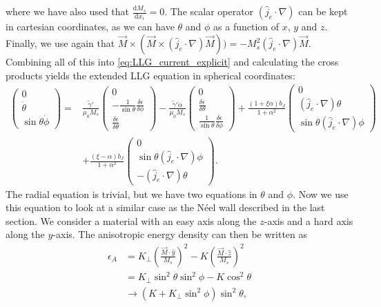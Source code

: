 \documentclass[12pt, a4paper, twoside, openright]{article}		%
\numberwithin{equation}{section}
\begin{document}
where we have also used that $\frac{\textrm{d} M_s}{\textrm{d} x_i} = 0$. The scalar operator $(\hat{j}_e\cdot\nabla)$ can be kept in cartesian coordinates, as we can have $\theta$ and $\phi$ as a function of $x$, $y$ and $z$. Finally, we use again that $\vec{M}\times (\vec{M}\times(\hat{j}_e\cdot\nabla)\vec{M})) = -M_s^2(\hat{j}_e\cdot\nabla)\vec{M}$. Combining all of this into \eqref{eq:LLG_current_explicit} and calculating the cross products yields the extended LLG equation in spherical coordinates:
\begin{align}
\nonumber \begin{pmatrix}
0 \\ \dot{\theta} \\ \sin\theta\dot{\phi}
\end{pmatrix} =
&\frac{\tilde{\gamma}'}{\mu_0 M_s}
\begin{pmatrix}
0 \\ -\frac{1}{\sin\theta} \frac{\delta \epsilon}{\delta \phi} \\ \frac{\delta \epsilon}{\delta \theta}
\end{pmatrix} - \frac{\tilde{\gamma}' \alpha}{\mu_0 M_s} 
\begin{pmatrix}
0 \\ \frac{\delta \epsilon}{\delta \theta} \\ \frac{1}{\sin\theta} \frac{\delta \epsilon}{\delta \phi}
\end{pmatrix} + \frac{(1+\xi\alpha)b_J}{1+\alpha^2}
\begin{pmatrix}
0 \\ (\hat{j}_e\cdot\nabla)\theta \\ \sin\theta(\hat{j}_e\cdot\nabla)\phi
\end{pmatrix} \\
&+\frac{(\xi-\alpha)b_J}{1+\alpha^2}
\begin{pmatrix}
0 \\ \sin\theta(\hat{j}_e\cdot\nabla)\phi \\ -(\hat{j}_e\cdot\nabla)\theta
\end{pmatrix}.
\label{eq:LLG_current_explicit_spherical}
\end{align}
The radial equation is trivial, but we have two equations in $\theta$ and $\phi$. Now we use this equation to look at a similar case as the N\'{e}el wall described in the last section. We consider a material with an easy axis along the $z$-axis and a hard axis along the $y$-axis. The anisotropic energy density can then be written as
\begin{align}
\nonumber \epsilon_A &= K_{\perp} \left(\frac{\vec{M}\cdot\hat{y}}{M_s}\right)^2 - K \left(\frac{\vec{M}\cdot\hat{z}}{M_s}\right)^2 \\
\nonumber &= K_{\perp}\sin^2\theta\sin^2\phi - K \cos^2\theta \\
&\rightarrow (K + K_{\perp} \sin^2\phi)\sin^2\theta,
\end{align}
\end{document}
